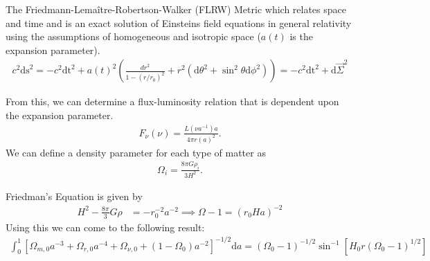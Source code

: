 The Friedmann-Lema\^{i}tre-Robertson-Walker (FLRW) Metric which relates space and time and is an exact solution of Einsteins field equations in general relativity using the assumptions of homogeneous and isotropic space ($a(t)$ is the expansion parameter).
\begin{align}
	c^2 \textrm{ds}^2=-c^2\textrm{dt}^2+a(t)^2\left(\frac{dr^2}{1-(r/r_0)^2}+r^2(\textrm{d}\theta^2+\sin^2\theta \textrm{d}\phi^2) \right) = -c^2\textrm{dt}^2+\textrm{d}\vec{\Sigma}^2
\end{align}
\begin{multicols}{2}
From this, we can determine a flux-luminosity relation that is dependent upon the expansion parameter.
\begin{align}
	F_\nu(\nu)=\frac{L(\nu a^{-1})a}{4\pi r(a)^2}.
\end{align}
We can define a density parameter for each type of matter as
\begin{align}
	\Omega_i = \frac{8\pi G \rho_i}{3H^2}.
\end{align}
\end{multicols}
Friedman's Equation is given by
\begin{align}
	H^2-\frac{8\pi}{3}G\rho &=-r_0^{-2}a^{-2} \implies
	\Omega-1 =(r_0Ha)^{-2}
\end{align}
Using this we can come to the following result:
\begin{align}
	\int_0^1[\Omega_{m,0}a^{-3}+\Omega_{r,0}a^{-4}+\Omega_{\nu,0}+(1-\Omega_0)a^{-2}]^{-1/2}\textrm{d}a = (\Omega_0-1)^{-1/2}\sin^{-1}[H_0r(\Omega_0-1)^{1/2}]
\end{align}



